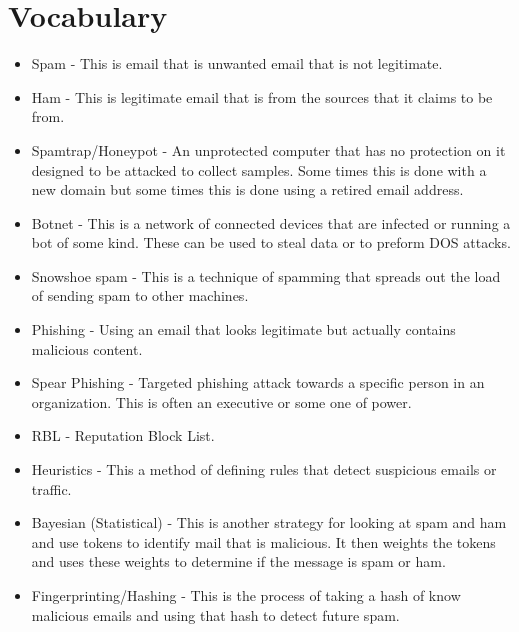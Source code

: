 \documentclass[letterpaper, onecolumn,10pt]{IEEEtran}
\begin{document}
		
		\section{Vocabulary}
		    \begin{itemize}
		        \item Spam - This is email that is unwanted email that is not legitimate.\\
		        \item Ham - This is legitimate email that is from the sources that it claims to be from.\\
		        \item Spamtrap/Honeypot - An unprotected computer that has no protection on it designed to be attacked to collect samples. Some times this is done with a new domain but some times this is done using a retired email address.\\
		        \item Botnet - This is a network of connected devices that are infected or running a bot of some kind. These can be used to steal data or to preform DOS attacks.\\
		        \item Snowshoe spam - This is a technique of spamming that spreads out the load of sending spam to other machines.\\
		        \item Phishing - Using an email that looks legitimate but actually contains malicious content.\\
		        \item Spear Phishing - Targeted phishing attack towards a specific person in an organization. This is often an executive or some one of power.\\
		        \item RBL - Reputation Block List.\\
		        \item Heuristics - This a method of defining rules that detect suspicious emails or traffic.\\
		        \item Bayesian (Statistical) - This is another strategy for looking at spam and ham and use tokens to identify mail that is malicious. It then weights the tokens and uses these weights to determine if the message is spam or ham.\\
		        \item Fingerprinting/Hashing - This is the process of taking a hash of know malicious emails and using that hash to detect future spam.\\
		    \end{itemize}
		
\end{document}
